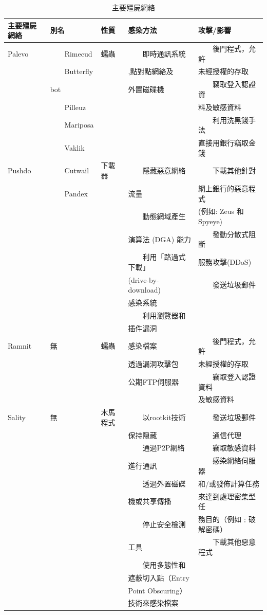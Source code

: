 \documentclass[14pt]{extarticle}
\newcommand{\tabitem}{~~\llap{\textbullet}~~}
\begin{document}
\begin{table}[!htbp]
\centering
\caption{主要殭屍網絡}
\begin{tabular}{lllll} \hline
\bf 主要殭屍網絡 & \bf 別名 & \bf 性質 & \bf 感染方法 & \bf 攻擊/影響\\\hline
Palevo & \tabitem Rimecud & 蠕蟲 & \tabitem 即時通訊系統  & \tabitem 後門程式，允許 \\
& \tabitem Butterfly & & ,點對點網絡及 & 未經授權的存取 \\
& bot & & 外置磁碟機 & \tabitem 竊取登入認證資 \\
& \tabitem Pilleuz &&& 料及敏感資料 \\
& \tabitem Mariposa &&& \tabitem 利用洗黑錢手法 \\
& \tabitem Vaklik &&& 直接用銀行竊取金錢 \\\hline
Pushdo & \tabitem Cutwail & 下載器 & \tabitem 隱藏惡意網絡 & \tabitem 下載其他針對\\
& \tabitem Pandex & & 流量 &  網上銀行的惡意程式 \\
& & & \tabitem 動態網域產生 & (例如: Zeus 和Spyeye) \\
& & & 演算法 (DGA) 能力 & \tabitem 發動分散式阻斷 \\
& & & \tabitem 利用「路過式下載」 & 服務攻擊(DDoS) \\
& & & (drive-by-download) & \tabitem 發送垃圾郵件 \\
& & & 感染系統 \\
& & & \tabitem 利用瀏覽器和 \\
& & & 插件漏洞 \\\hline
Ramnit & 無	& 蠕蟲 &	感染檔案 & \tabitem 後門程式，允許 \\
& & & 透過漏洞攻擊包 & 未經授權的存取 \\
& & & 公期FTP伺服器 & \tabitem 竊取登入認證資料 \\
&&&&及敏感資料 \\\hline


Sality & 無 & 	木馬程式	& \tabitem 以rootkit技術 & \tabitem 發送垃圾郵件 \\
&&& 保持隠藏 & \tabitem 通信代理 \\	
&&& \tabitem 通過P2P網絡 & \tabitem 竊取敏感資料 \\
&&& 進行通訊 & \tabitem 感染網絡伺服器 \\
&&& \tabitem 透過外置磁碟 & 和/或發佈計算任務 \\
&&& 機或共享傳播 & 來達到處理密集型任 \\ 
&&&	\tabitem 停止安全檢測 &務目的（例如﹕破解密碼）\\
&&& 工具 & \tabitem 下載其他惡意程式 \\
&&&	\tabitem 使用多態性和\\
&&& 遮蔽切入點（Entry \\
&&& Point Obscuring）\\
&&& 技術來感染檔案 \\\hline

\end{tabular}
\end{table}
\end{document}
